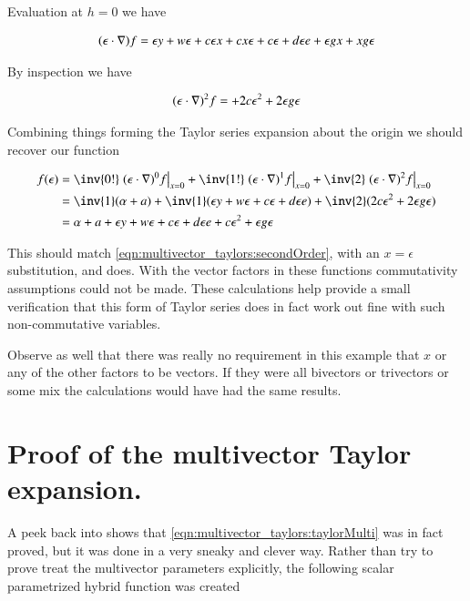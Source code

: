 Evaluation at $h=0$ we have

\begin{align*}
(\epsilon \cdot \nabla) f
&=
\epsilon y 
+ w \epsilon
+ c \epsilon x 
+ c x \epsilon
+ c \epsilon 
+ d \epsilon e 
+ \epsilon g x 
+ x g \epsilon \\
\end{align*}

By inspection we have

\begin{align*}
(\epsilon \cdot \nabla)^2 f
&=
+ 2 c \epsilon^2
+ 2 \epsilon g \epsilon \\
\end{align*}

Combining things forming the Taylor series expansion about the origin we should recover our function

\begin{align*}
f(\epsilon) 
&= \inv{0!} \left. (\epsilon \cdot \grad)^0 f \right\vert_{x=0} 
+ \inv{1!} \left. (\epsilon \cdot \grad)^1 f \right\vert_{x=0} 
+ \inv{2} \left. (\epsilon \cdot \grad)^2 f \right\vert_{x=0} \\
&= \inv{1} (\alpha + a) + \inv{1} (\epsilon y + w \epsilon + c \epsilon + d \epsilon e ) + \inv{2}(2 c \epsilon^2 + 2 \epsilon g \epsilon ) \\
&= \alpha + a + \epsilon y + w \epsilon + c \epsilon + d \epsilon e + c \epsilon^2 + \epsilon g \epsilon \\
\end{align*}

This should match \ref{eqn:multivector_taylors:secondOrder}, with an $x = \epsilon$ substitution, and does.  With the vector factors in these functions commutativity 
assumptions could not be made.  These calculations 
help provide a small verification that this form
of Taylor series does in fact work out fine with such non-commutative variables.

Observe as well that there was really no requirement in this example that $x$ or any of the other factors to be vectors.  If they were all bivectors or trivectors or some mix the calculations would have had the same results.

\section{Proof of the multivector Taylor expansion. }

A peek back into \cite{hestenes1999nfc} shows that 
\ref{eqn:multivector_taylors:taylorMulti} was in fact proved, but it was done in a very
sneaky and clever way.  Rather than try to prove treat the multivector
parameters explicitly, the following scalar parametrized hybrid function
was created


